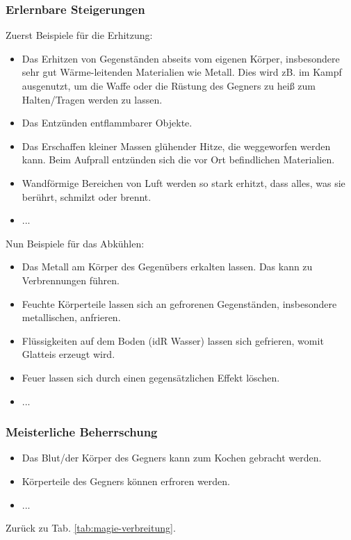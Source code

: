 \subsubsection{Erlernbare Steigerungen}
Zuerst Beispiele für die Erhitzung:
\begin{itemize}
	\item Das Erhitzen von Gegenständen abseits vom eigenen Körper, insbesondere sehr gut Wärme-leitenden Materialien wie Metall. Dies wird zB. im Kampf ausgenutzt, um die Waffe oder die Rüstung des Gegners zu heiß zum Halten/Tragen werden zu lassen.
	\item Das Entzünden entflammbarer Objekte.
	\item Das Erschaffen kleiner Massen glühender Hitze, die weggeworfen werden kann. Beim Aufprall entzünden sich die vor Ort befindlichen Materialien. 
	\item Wandförmige Bereichen von Luft werden so stark erhitzt, dass alles, was sie berührt, schmilzt oder brennt.
	\item ...
\end{itemize}

Nun Beispiele für das Abkühlen:
\begin{itemize}
	\item Das Metall am Körper des Gegenübers erkalten lassen. Das kann zu Verbrennungen führen.
	\item Feuchte Körperteile lassen sich an gefrorenen Gegenständen, insbesondere metallischen, anfrieren.
	\item Flüssigkeiten auf dem Boden (idR Wasser) lassen sich gefrieren, womit Glatteis erzeugt wird.
	\item Feuer lassen sich durch einen gegensätzlichen Effekt löschen.
	\item ...
\end{itemize}

\subsubsection{Meisterliche Beherrschung} 
\begin{itemize}
	\item Das Blut/der Körper des Gegners kann zum Kochen gebracht werden.
	\item Körperteile des Gegners können erfroren werden.
	\item ...
\end{itemize}
Zurück zu Tab. \ref{tab:magie-verbreitung}.




